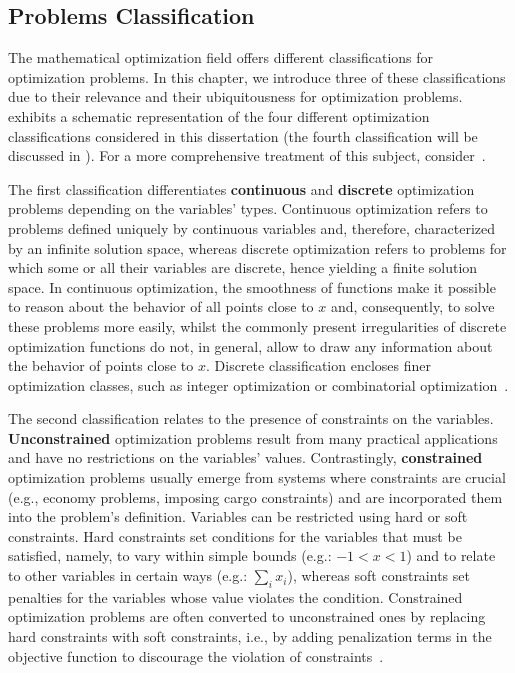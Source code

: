 	
\subsection{Problems Classification}
	
	The mathematical optimization field offers different classifications for optimization problems. In this chapter, we introduce three of these classifications due to their relevance and their ubiquitousness for optimization problems.  exhibits a schematic representation of the four different optimization classifications considered in this dissertation (the fourth classification will be discussed in ). For a more comprehensive treatment of this subject, consider~\cite{Nemhauser1988,Nocedal2011NumericalOptimization}. 
	 
	The first classification differentiates \textbf{continuous} and \textbf{discrete} optimization problems depending on the variables' types. Continuous optimization refers to problems defined uniquely by continuous variables and, therefore, characterized by an infinite solution space, whereas discrete optimization refers to problems for which some or all their variables are discrete, hence yielding a finite solution space. In continuous optimization, the smoothness of functions make it possible to reason about the behavior of all points close to $x$ and, consequently, to solve these problems more easily, whilst the commonly present irregularities of discrete optimization functions do not, in general, allow to draw any information about the behavior of points close to $x$. Discrete classification encloses finer optimization classes, such as integer optimization or combinatorial optimization~\cite{Nemhauser1988}. 
	
	The second classification relates to the presence of constraints on the variables. \textbf{Unconstrained} optimization problems result from many practical applications and have no restrictions on the variables' values. Contrastingly, \textbf{constrained} optimization problems usually emerge from systems where constraints are crucial (e.g., economy problems, imposing cargo constraints) and are incorporated them into the problem's definition. Variables can be restricted using hard or soft constraints. Hard constraints set conditions for the variables that must be satisfied, namely, to vary within simple bounds (e.g.: $-1<x<1$) and to relate to other variables in certain ways (e.g.: $\sum_{i} x_i$), whereas soft constraints set penalties for the variables whose value violates the condition. Constrained optimization problems are often converted to unconstrained ones by replacing hard constraints with soft constraints, i.e., by adding penalization terms in the objective function to discourage the violation of constraints~\cite{Nocedal2011NumericalOptimization}. 

